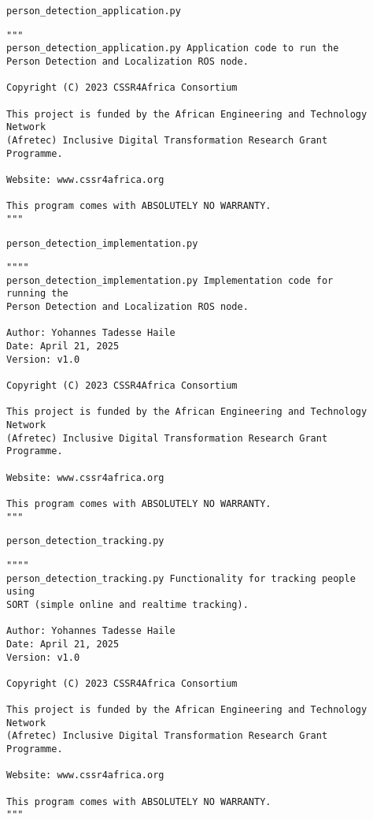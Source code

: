 \documentclass{CSSRforAfrica}
\newcommand{\blank}{~\\}
\newcommand{\checkboxChecked}{\fbox{\ding{51}}} %
\begin{document}
\begin{description}

\item[\checkboxChecked] {\small \verb+person_detection_application.py+}  
{\small \begin{verbatim}
"""
person_detection_application.py Application code to run the 
Person Detection and Localization ROS node.

Copyright (C) 2023 CSSR4Africa Consortium

This project is funded by the African Engineering and Technology Network 
(Afretec) Inclusive Digital Transformation Research Grant Programme.

Website: www.cssr4africa.org

This program comes with ABSOLUTELY NO WARRANTY.
"""

\end{verbatim} }

\item[\checkboxChecked]  {\small \verb+person_detection_implementation.py+}  
{\small \begin{verbatim}
""""
person_detection_implementation.py Implementation code for running the 
Person Detection and Localization ROS node.

Author: Yohannes Tadesse Haile
Date: April 21, 2025
Version: v1.0

Copyright (C) 2023 CSSR4Africa Consortium

This project is funded by the African Engineering and Technology Network 
(Afretec) Inclusive Digital Transformation Research Grant Programme.

Website: www.cssr4africa.org

This program comes with ABSOLUTELY NO WARRANTY.
"""
\end{verbatim} }

\newpage
\item[\checkboxChecked]  {\small \verb+person_detection_tracking.py+}  
{\small \begin{verbatim}
""""
person_detection_tracking.py Functionality for tracking people using 
SORT (simple online and realtime tracking).

Author: Yohannes Tadesse Haile
Date: April 21, 2025
Version: v1.0

Copyright (C) 2023 CSSR4Africa Consortium

This project is funded by the African Engineering and Technology Network 
(Afretec) Inclusive Digital Transformation Research Grant Programme.

Website: www.cssr4africa.org

This program comes with ABSOLUTELY NO WARRANTY.
"""
\end{verbatim} }


\end{description} 
\end{document}
